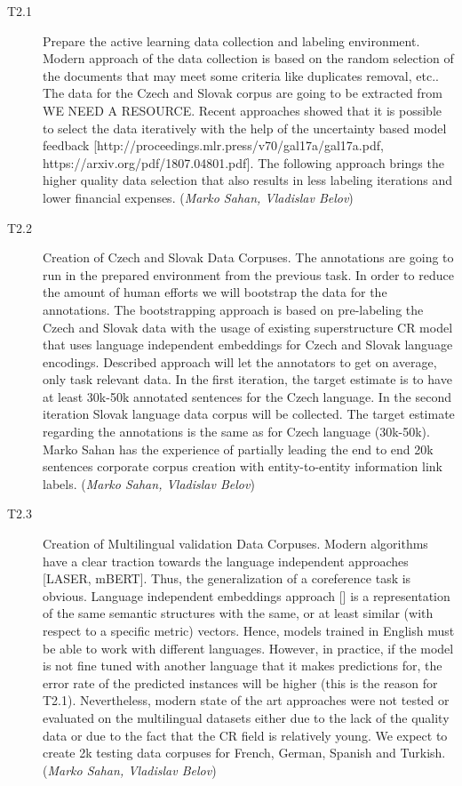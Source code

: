 \begin{description}
	\item [T2.1] Prepare the active learning data collection and labeling environment.
Modern approach of the data collection is based on the random selection of the documents that may meet some criteria like duplicates removal, etc.. The data for the Czech and Slovak corpus are going to be extracted from {\color{red} WE NEED A RESOURCE}. Recent approaches showed that it is possible to select the data iteratively with the help of the uncertainty based model feedback [http://proceedings.mlr.press/v70/gal17a/gal17a.pdf, https://arxiv.org/pdf/1807.04801.pdf]. The following approach brings the higher quality data selection that also results in less labeling iterations and lower financial expenses. (\textit{Marko Sahan, Vladislav Belov})
	\item [T2.2] Creation of Czech and Slovak Data Corpuses. The annotations are going to run in the prepared environment from the previous task. In order to reduce the amount of human efforts we will bootstrap the data for the annotations. The bootstrapping approach is based on pre-labeling the Czech and Slovak data with the usage of existing superstructure CR model that uses language independent embeddings for Czech and Slovak language encodings. Described approach will let the annotators to get on average, only task relevant data.
In the first iteration, the target estimate is to have at least 30k-50k annotated sentences for the Czech language. In the second iteration Slovak language data corpus will be collected. The target estimate regarding the annotations is the same as for Czech language (30k-50k). Marko Sahan has the experience of partially leading the end to end 20k sentences corporate corpus creation with entity-to-entity information link labels.  (\textit{Marko Sahan, Vladislav Belov})
	\item [T2.3] Creation of Multilingual validation Data Corpuses. 
Modern algorithms have a clear traction towards the language independent approaches [LASER, mBERT]. Thus, the generalization of a coreference task is obvious. Language independent embeddings approach [] is a representation of the same semantic structures with the same, or at least similar (with respect to a specific metric) vectors. Hence, models trained in English must be able to work with different languages. However, in practice, if the model is not fine tuned with another language that it makes predictions for, the error rate of the predicted instances will be higher (this is the reason for T2.1). Nevertheless, modern state of the art approaches were not tested or evaluated on the multilingual datasets either due to the lack of the quality data or due to the fact that the CR field is relatively young. We expect to create 2k testing data corpuses for French, German, Spanish and Turkish. (\textit{Marko Sahan, Vladislav Belov})
\end{description}


